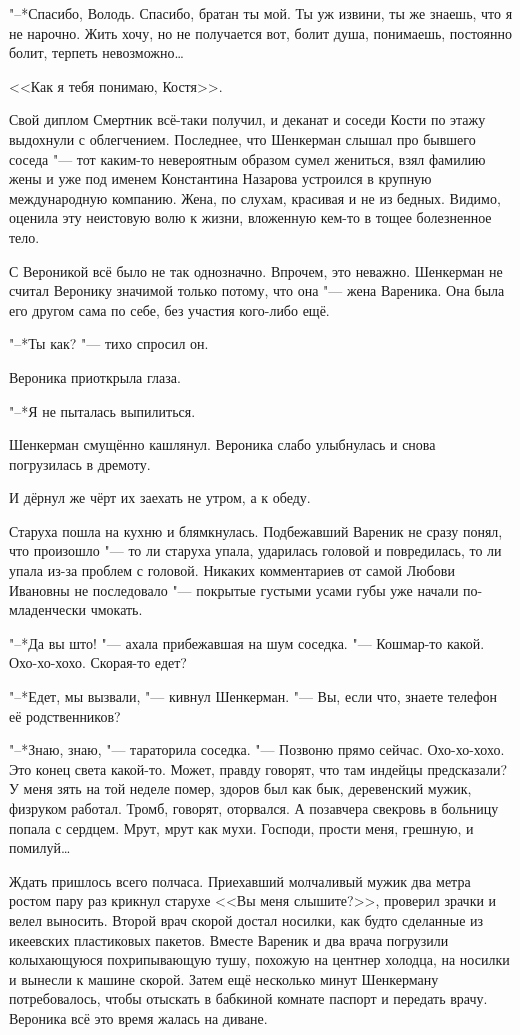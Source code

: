 "--*Спасибо, Володь.
Спасибо, братан ты мой.
Ты уж извини, ты же знаешь, что я не нарочно.
Жить хочу, но не получается вот, болит душа, понимаешь, постоянно болит, терпеть невозможно\ldots{}

<<Как я тебя понимаю, Костя>>.

Свой диплом Смертник всё-таки получил, и деканат и соседи Кости по этажу выдохнули с облегчением.
Последнее, что Шенкерман слышал про бывшего соседа "--- тот каким-то невероятным образом сумел жениться, взял фамилию жены и уже под именем Константина Назарова устроился в крупную международную компанию.
Жена, по слухам, красивая и не из бедных.
Видимо, оценила эту неистовую волю к жизни, вложенную кем-то в тощее болезненное тело.

С Вероникой всё было не так однозначно.
Впрочем, это неважно.
Шенкерман не считал Веронику значимой только потому, что она "--- жена Вареника.
Она была его другом сама по себе, без участия кого-либо ещё.

"--*Ты как? "--- тихо спросил он.

Вероника приоткрыла глаза.

"--*Я не пыталась выпилиться.

Шенкерман смущённо кашлянул.
Вероника слабо улыбнулась и снова погрузилась в дремоту.

\asterism

И дёрнул же чёрт их заехать не утром, а к обеду.

Старуха пошла на кухню и блямкнулась.
Подбежавший Вареник не сразу понял, что произошло "--- то ли старуха упала, ударилась головой и повредилась, то ли упала из-за проблем с головой.
Никаких комментариев от самой Любови Ивановны не последовало "--- покрытые густыми усами губы уже начали по-младенчески чмокать.

"--*Да вы што! "--- ахала прибежавшая на шум соседка.
"--- Кошмар-то какой.
Охо-хо-хохо.
Скорая-то едет?

"--*Едет, мы вызвали, "--- кивнул Шенкерман.
"--- Вы, если что, знаете телефон её родственников?

"--*Знаю, знаю, "--- тараторила соседка.
"--- Позвоню прямо сейчас.
Охо-хо-хохо.
Это конец света какой-то.
Может, правду говорят, что там индейцы предсказали?
У меня зять на той неделе помер, здоров был как бык, деревенский мужик, физруком работал.
Тромб, говорят, оторвался.
А позавчера свекровь в больницу попала с сердцем.
Мрут, мрут как мухи.
Господи, прости меня, грешную, и помилуй\ldots{}

Ждать пришлось всего полчаса.
Приехавший молчаливый мужик два метра ростом пару раз крикнул старухе <<Вы меня слышите?>>, проверил зрачки и велел выносить.
Второй врач скорой достал носилки, как будто сделанные из икеевских пластиковых пакетов.
Вместе Вареник и два врача погрузили колыхающуюся похрипывающую тушу, похожую на центнер холодца, на носилки и вынесли к машине скорой.
Затем ещё несколько минут Шенкерману потребовалось, чтобы отыскать в бабкиной комнате паспорт и передать врачу.
Вероника всё это время жалась на диване.

